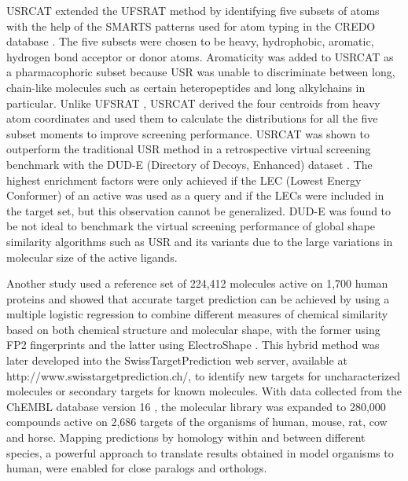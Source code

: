 USRCAT \citep{1331} extended the UFSRAT \citep{1436} method by identifying five subsets of atoms with the help of the SMARTS patterns used for atom typing in the CREDO database \citep{522}. The five subsets were chosen to be heavy, hydrophobic, aromatic, hydrogen bond acceptor or donor atoms. Aromaticity was added to USRCAT as a pharmacophoric subset because USR was unable to discriminate between long, chain-like molecules such as certain heteropeptides and long alkylchains in particular. Unlike UFSRAT \citep{1436}, USRCAT \citep{1331} derived the four centroids from heavy atom coordinates and used them to calculate the distributions for all the five subset moments to improve screening performance. USRCAT was shown to outperform the traditional USR method in a retrospective virtual screening benchmark with the DUD-E (Directory of Decoys, Enhanced) dataset \citep{1185}. The highest enrichment factors were only achieved if the LEC (Lowest Energy Conformer) of an active was used as a query and if the LECs were included in the target set, but this observation cannot be generalized. DUD-E was found to be not ideal to benchmark the virtual screening performance of global shape similarity algorithms such as USR and its variants due to the large variations in molecular size of the active ligands.

Another study \citep{1407} used a reference set of 224,412 molecules active on 1,700 human proteins and showed that accurate target prediction can be achieved by using a multiple logistic regression to combine different measures of chemical similarity based on both chemical structure and molecular shape, with the former using FP2 fingerprints and the latter using ElectroShape \citep{1338}. This hybrid method was later developed into the SwissTargetPrediction \citep{1408} web server, available at http://www.swisstargetprediction.ch/, to identify new targets for uncharacterized molecules or secondary targets for known molecules. With data collected from the ChEMBL database version 16 \citep{1441}, the molecular library was expanded to 280,000 compounds active on 2,686 targets of the organisms of human, mouse, rat, cow and horse. Mapping predictions by homology within and between different species, a powerful approach to translate results obtained in model organisms to human, were enabled for close paralogs and orthologs.

